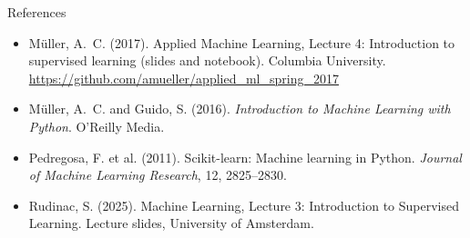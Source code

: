 \documentclass[handout,aspectratio=169,t,9pt]{beamer}
\begin{document}
\begin{frame}{References}
  \scriptsize
  \begin{itemize}
    \item M\"{u}ller, A.~C. (2017).  Applied Machine Learning, Lecture 4:
          Introduction to supervised learning (slides and notebook).
          Columbia University.
          \url{https://github.com/amueller/applied_ml_spring_2017}
    \item M\"{u}ller, A.~C. and Guido, S. (2016).  \emph{Introduction to
          Machine Learning with Python}.  O'Reilly Media.
    \item Pedregosa, F. et al. (2011).  Scikit-learn: Machine learning in
          Python.  \emph{Journal of Machine Learning Research}, 12,
          2825--2830.
    \item Rudinac, S. (2025).  Machine Learning, Lecture 3: Introduction to
          Supervised Learning.  Lecture slides, University of Amsterdam.
  \end{itemize}
\end{frame}
\end{document}
